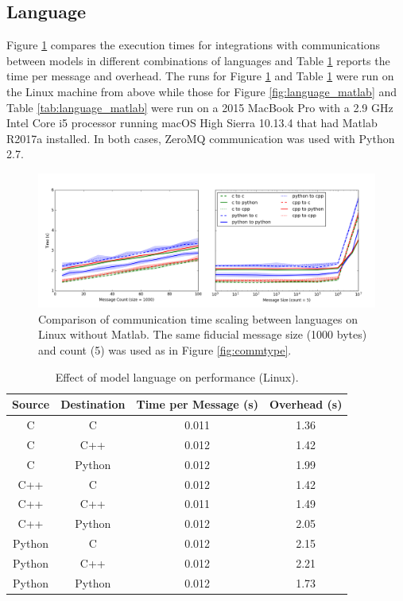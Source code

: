 \documentclass[journal]{IEEEtran}
\begin{document}
\subsection{Language}\label{SS:results_language}
%
Figure \ref{fig:language} compares the execution times for integrations with communications between models in different combinations of languages and Table \ref{tab:language} reports the time per message and overhead. The runs for Figure \ref{fig:language} and Table \ref{tab:language} were run on the Linux machine from above while those for Figure \ref{fig:language_matlab} and Table \ref{tab:language_matlab} were run on a 2015 MacBook Pro with a 2.9 GHz Intel Core i5 processor running macOS High Sierra 10.13.4 that had Matlab R2017a installed. In both cases, ZeroMQ communication was used with Python 2.7.
%
\ifinclfig
 	\begin{figure}[htbp]
	\begin{center}
	\includegraphics[width=\columnwidth,keepaspectratio]{./images/scaling_language.png}
	\caption{Comparison of communication time scaling between languages on Linux without Matlab. The same fiducial message size (1000 bytes) and count (5) was used as in Figure \ref{fig:commtype}.}
	\label{fig:language}
	\end{center}
	\end{figure}
\fi
%
\begin{table}[htbp]
\begin{center}
\begin{tabular}{|c|c|c|c|}
\hline
Source 	& Destination 	& Time per Message (s) 	& Overhead (s) 	\\\hline
C 				& C					& 0.011				& 1.36			\\
C 				& C++				& 0.012				& 1.42			\\
C 				& Python				& 0.012				& 1.99			\\
\hline%
C++ 				& C					& 0.012				& 1.42			\\
C++ 				& C++				& 0.011				& 1.49			\\
C++ 				& Python				& 0.012				& 2.05			\\
\hline%
Python			& C					& 0.012				& 2.15			\\
Python			& C++				& 0.012				& 2.21			\\
Python			& Python				& 0.012				& 1.73			\\
\hline
\end{tabular}
\end{center}
\caption{Effect of model language on performance (Linux).}
\label{tab:language}
\end{table}%
\end{document}
